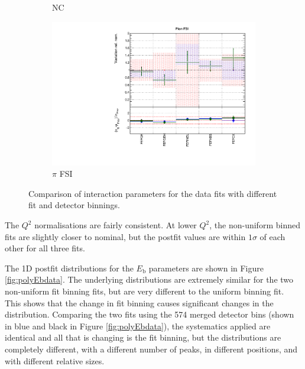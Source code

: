 \begin{figure}[!htbp]
\begin{subfigure}{0.49\textwidth}
  \caption{NC}
\end{subfigure}
\begin{subfigure}{0.49\textwidth}
  \centering
  \includegraphics[width=0.9\linewidth]{figs/polydataxsec_5}
  \caption{$\pi$ FSI}
\end{subfigure}
\caption{Comparison of interaction parameters for the data fits with different fit and detector binnings.}
\label{fig:polydataxsec}
\end{figure}

The $Q^2$ normalisations are fairly consistent. At lower $Q^2$, the non-uniform binned fits are slightly closer to nominal, but the postfit values are within $1\sigma$ of each other for all three fits. 

The 1D postfit distributions for the $E_{\mathrm{b}}$ parameters are shown in Figure \ref{fig:polyEbdata}. The underlying distributions are extremely similar for the two non-uniform fit binning fits, but are very different to the uniform binning fit. This shows that the change in fit binning causes significant changes in the distribution. Comparing the two fits using the 574 merged detector bins (shown in blue and black in Figure \ref{fig:polyEbdata}), the systematics applied are identical and all that is changing is the fit binning, but the distributions are completely different, with a different number of peaks, in different positions, and with different relative sizes. 

